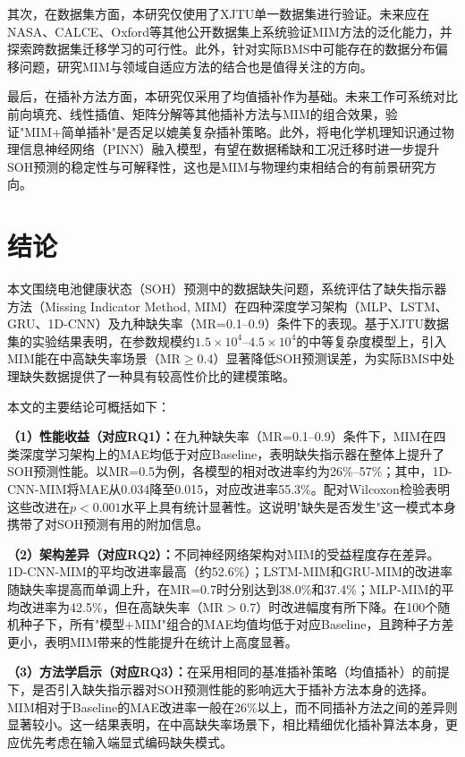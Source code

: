\documentclass[10pt,a4paper]{ctexart}
\begin{document}
其次，在数据集方面，本研究仅使用了XJTU单一数据集进行验证。未来应在NASA、CALCE、Oxford等其他公开数据集上系统验证MIM方法的泛化能力，并探索跨数据集迁移学习的可行性。此外，针对实际BMS中可能存在的数据分布偏移问题，研究MIM与领域自适应方法的结合也是值得关注的方向。

最后，在插补方法方面，本研究仅采用了均值插补作为基础。未来工作可系统对比前向填充、线性插值、矩阵分解等其他插补方法与MIM的组合效果，验证"MIM+简单插补"是否足以媲美复杂插补策略。此外，将电化学机理知识通过物理信息神经网络（PINN）融入模型，有望在数据稀缺和工况迁移时进一步提升SOH预测的稳定性与可解释性\cite{wang2024pinn}，这也是MIM与物理约束相结合的有前景研究方向。

\section{结论}\label{sec:conclusion}

本文围绕电池健康状态（SOH）预测中的数据缺失问题，系统评估了缺失指示器方法（Missing Indicator Method, MIM）在四种深度学习架构（MLP、LSTM、GRU、1D-CNN）及九种缺失率（MR=0.1--0.9）条件下的表现。基于XJTU数据集的实验结果表明，在参数规模约$1.5\times 10^4$--$4.5\times 10^4$的中等复杂度模型上，引入MIM能在中高缺失率场景（MR$\geq$0.4）显著降低SOH预测误差，为实际BMS中处理缺失数据提供了一种具有较高性价比的建模策略。

本文的主要结论可概括如下：

\textbf{（1）性能收益（对应RQ1）：}在九种缺失率（MR=0.1--0.9）条件下，MIM在四类深度学习架构上的MAE均低于对应Baseline，表明缺失指示器在整体上提升了SOH预测性能。以MR=0.5为例，各模型的相对改进率约为26\%--57\%；其中，1D-CNN-MIM将MAE从0.034降至0.015，对应改进率55.3\%。配对Wilcoxon检验表明这些改进在$p<0.001$水平上具有统计显著性。这说明"缺失是否发生"这一模式本身携带了对SOH预测有用的附加信息。

\textbf{（2）架构差异（对应RQ2）：}不同神经网络架构对MIM的受益程度存在差异。1D-CNN-MIM的平均改进率最高（约52.6\%）；LSTM-MIM和GRU-MIM的改进率随缺失率提高而单调上升，在MR=0.7时分别达到38.0\%和37.4\%；MLP-MIM的平均改进率为42.5\%，但在高缺失率（MR$>$0.7）时改进幅度有所下降。在100个随机种子下，所有"模型+MIM"组合的MAE均值均低于对应Baseline，且跨种子方差更小，表明MIM带来的性能提升在统计上高度显著。

\textbf{（3）方法学启示（对应RQ3）：}在采用相同的基准插补策略（均值插补）的前提下，是否引入缺失指示器对SOH预测性能的影响远大于插补方法本身的选择。MIM相对于Baseline的MAE改进率一般在26\%以上，而不同插补方法之间的差异则显著较小。这一结果表明，在中高缺失率场景下，相比精细优化插补算法本身，更应优先考虑在输入端显式编码缺失模式。
\end{document}
